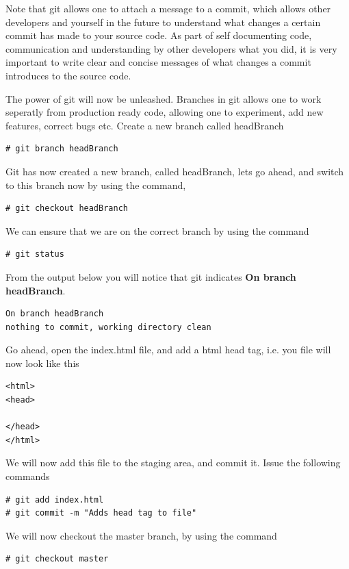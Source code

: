 \documentclass[a4paper,10pt]{article}
\begin{document}
Note that git allows one to attach a message to a commit, which allows other developers and yourself in the future to understand what changes a certain commit has made to your source code. As part of self documenting code, communication and understanding by other developers what you did, it is very important to write clear and concise messages of what changes a commit introduces to the source code.

The power of git will now be unleashed. Branches in git allows one to work seperatly from production ready code, allowing one to experiment, add new features, correct bugs etc. Create a new branch called headBranch
\begin{lstlisting}[style=TerminalStyle]
# git branch headBranch
\end{lstlisting}

Git has now created a new branch, called headBranch, lets go ahead, and switch to this branch now by using the command,
\begin{lstlisting}[style=TerminalStyle]
# git checkout headBranch
\end{lstlisting}

We can ensure that we are on the correct branch by using the command 
\begin{lstlisting}[style=TerminalStyle]
# git status
\end{lstlisting}

From the output below you will notice that git indicates \textbf{On branch headBranch}.
\begin{lstlisting}[style=OutputStyle]
On branch headBranch
nothing to commit, working directory clean
\end{lstlisting}

Go ahead, open the index.html file, and add a html head tag, i.e. you file will now look like this
\begin{lstlisting}[style=HtmlStyle]
<html>
<head>

</head>
</html>
\end{lstlisting}

We will now add this file to the staging area, and commit it. Issue the following commands
\begin{lstlisting}[style=TerminalStyle]
# git add index.html
# git commit -m "Adds head tag to file"
\end{lstlisting}

We will now checkout the master branch, by using the command
\begin{lstlisting}[style=TerminalStyle]
# git checkout master
\end{lstlisting}
\end{document}
